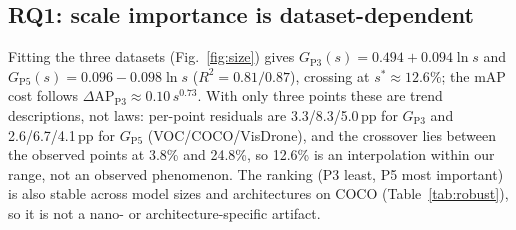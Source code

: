 \documentclass[a4paper,fleqn]{cas-dc}
\begin{document}
\subsection{RQ1: scale importance is dataset-dependent}
\begin{table}[h]\centering\footnotesize
\caption{Per-scale importance is monotonically tied to the small-object fraction $s$: gradient contribution $G$ (cols. 3--4) and mAP cost $\Delta$AP of removing a scale (cols. 5--6). The redundant scale flips between VOC (drop P3) and VisDrone (drop P5).}
\label{tab:scales}

\end{table}
Fitting the three datasets (Fig.~\ref{fig:size}) gives $G_{\mathrm{P3}}(s)=0.494+0.094\ln s$ and $G_{\mathrm{P5}}(s)=0.096-0.098\ln s$ ($R^2=0.81/0.87$), crossing at $s^*\approx12.6\%$; the mAP cost follows $\Delta\text{AP}_{\mathrm{P3}}\approx0.10\,s^{0.73}$. With only three points these are trend descriptions, not laws: per-point residuals are 3.3/8.3/5.0\,pp for $G_{\mathrm{P3}}$ and 2.6/6.7/4.1\,pp for $G_{\mathrm{P5}}$ (VOC/COCO/VisDrone), and the crossover lies between the observed points at 3.8\% and 24.8\%, so 12.6\% is an interpolation within our range, not an observed phenomenon. The ranking (P3 least, P5 most important) is also stable across model sizes and architectures on COCO (Table~\ref{tab:robust}), so it is not a nano- or architecture-specific artifact.
\end{document}

